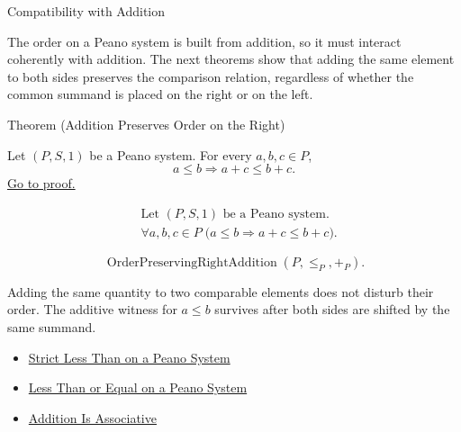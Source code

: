\begin{topicbox}{Compatibility with Addition}
\begin{exposition}
The order on a Peano system is built from addition, so it must interact
coherently with addition. The next theorems show that adding the same element
to both sides preserves the comparison relation, regardless of whether the
common summand is placed on the right or on the left.
\end{exposition}

\begin{theorembox}{Theorem (Addition Preserves Order on the Right)}
\begin{theorem}
\label{thm:addition-preserves-order-on-right}
Let $(P,S,1)$ be a Peano system. For every $a,b,c \in P$,
\[
a \le b
\Longrightarrow
a+c \le b+c.
\]
\hyperref[prf:addition-preserves-order-on-right]{Go to proof.}
\end{theorem}
\end{theorembox}

\begin{remark*}
\[
\begin{aligned}
&\text{Let } (P,S,1) \text{ be a Peano system.}\\
&\forall a,b,c \in P\;
\bigl(a \le b \Longrightarrow a+c \le b+c\bigr).
\end{aligned}
\]
\end{remark*}

\begin{remark*}
\[
\operatorname{OrderPreservingRightAddition}(P,\leq_P,+_P).
\]
\end{remark*}

\begin{remark*}[Interpretation]
Adding the same quantity to two comparable elements does not disturb their
order. The additive witness for $a \le b$ survives after both sides are shifted
by the same summand.
\end{remark*}

\begin{dependencies}
\begin{itemize}
  \item \hyperref[def:strict-less-than-on-peano-system]{Strict Less Than on a Peano System}
  \item \hyperref[def:less-than-or-equal-on-peano-system]{Less Than or Equal on a Peano System}
  \item \hyperref[thm:addition-associative]{Addition Is Associative}
\end{itemize}
\end{dependencies}


\end{topicbox}
